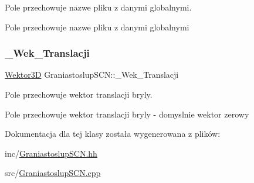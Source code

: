 Pole przechowuje nazwe pliku z danymi globalnymi. 

Pole przechowuje nazwe pliku z danymi globalnymi \mbox{\label{classGraniastoslupSCN_a8d6e1399862324d18f3dee74c41212d0}} 
\subsubsection{\texorpdfstring{\+\_\+\+Wek\+\_\+\+Translacji}{\_Wek\_Translacji}}
{\footnotesize\ttfamily \hyperlink{classSWektor}{Wektor3D} Graniastoslup\+S\+C\+N\+::\+\_\+\+Wek\+\_\+\+Translacji\hspace{0.3cm}{\ttfamily [private]}}



Pole przechowuje wektor translacji bryly. 

Pole przechowuje wektor translacji bryly -\/ domyslnie wektor zerowy 

Dokumentacja dla tej klasy została wygenerowana z plików\+:\begin{DoxyCompactItemize}
\item 
inc/\hyperlink{GraniastoslupSCN_8hh}{Graniastoslup\+S\+C\+N.\+hh}\item 
src/\hyperlink{GraniastoslupSCN_8cpp}{Graniastoslup\+S\+C\+N.\+cpp}\end{DoxyCompactItemize}
